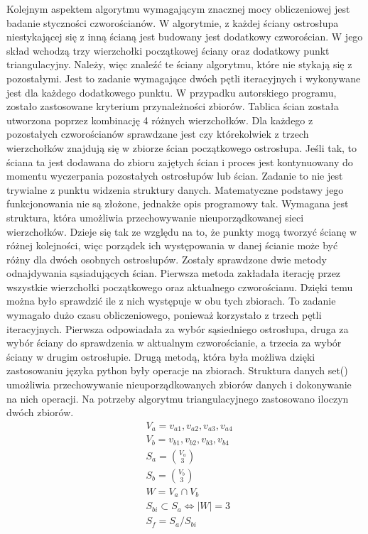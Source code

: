 Kolejnym aspektem algorytmu wymagającym znacznej mocy obliczeniowej jest badanie styczności czworościanów. W algorytmie, z każdej ściany ostrosłupa niestykającej się z inną ścianą jest budowany jest dodatkowy czworościan. W jego skład wchodzą trzy wierzchołki początkowej ściany oraz dodatkowy punkt triangulacyjny. Należy, więc znaleźć te ściany algorytmu, które nie stykają się z pozostałymi. Jest to zadanie wymagające dwóch pętli iteracyjnych i wykonywane jest dla każdego dodatkowego punktu. W przypadku autorskiego programu, zostało zastosowane kryterium przynależności zbiorów. Tablica ścian została utworzona poprzez kombinację 4 różnych wierzchołków. Dla każdego z pozostałych czworościanów sprawdzane jest czy którekolwiek z trzech wierzchołków znajdują się w zbiorze ścian początkowego ostrosłupa. Jeśli tak, to ściana ta jest dodawana do zbioru zajętych ścian i proces jest kontynuowany do momentu wyczerpania pozostałych ostrosłupów lub ścian. Zadanie to nie jest trywialne z punktu widzenia struktury danych. Matematyczne podstawy jego funkcjonowania nie są złożone, jednakże opis programowy tak. Wymagana jest struktura, która umożliwia przechowywanie nieuporządkowanej sieci wierzchołków. Dzieje się tak ze względu na to, że punkty mogą tworzyć ścianę w różnej kolejności, więc porządek ich występowania w danej ścianie może być różny dla dwóch osobnych ostrosłupów. Zostały sprawdzone dwie metody odnajdywania sąsiadujących ścian.
\newline \indent Pierwsza metoda zakładała iterację przez wszystkie wierzchołki początkowego oraz aktualnego czworościanu. Dzięki temu można było sprawdzić ile z nich występuje w obu tych zbiorach. To zadanie wymagało dużo czasu obliczeniowego, ponieważ korzystało z trzech pętli iteracyjnych. Pierwsza odpowiadała za wybór sąsiedniego ostrosłupa, druga za wybór ściany do sprawdzenia w aktualnym czworościanie, a trzecia za wybór ściany w drugim ostrosłupie.
\newline \indent Drugą metodą, która była możliwa dzięki zastosowaniu języka python były operacje na zbiorach. Struktura danych set() umożliwia przechowywanie nieuporządkowanych zbiorów danych i dokonywanie na nich operacji. Na potrzeby algorytmu triangulacyjnego zastosowano iloczyn dwóch zbiorów.
\begin{equation}
    \begin{aligned}
    &V_{a}={v_{a1},v_{a2},v_{a3},v_{a4}}\\
    &V_{b}={v_{b1},v_{b2},v_{b3},v_{b4}}\\
    &S_{a}=\binom{V_{a}}{3}\\
    &S_{b}=\binom{V_{b}}{3}\\
    &W=V_{a} \cap V_{b}\\
    &S_{bi} 	\subset S_{a} \Leftrightarrow |W|=3\\
    &S_{f}=S_{a}/S_{bi}
    \end{aligned}
\end{equation}
